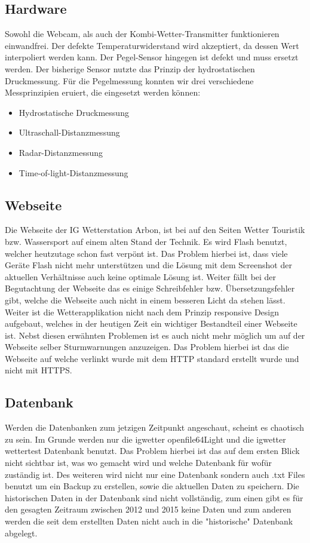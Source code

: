 \documentclass[a4paper,ngerman, 11pt, pagesize]{report}
\begin{document}
\subsection{Hardware}
Sowohl die Webcam, als auch der Kombi-Wetter-Transmitter funktionieren einwandfrei. Der defekte Temperaturwiderstand wird akzeptiert, da dessen Wert interpoliert werden kann. Der Pegel-Sensor hingegen ist defekt und muss ersetzt werden. Der bisherige Sensor nutzte das Prinzip der hydrostatischen Druckmessung. Für die Pegelmessung konnten wir drei verschiedene Messprinzipien eruiert, die eingesetzt werden können:

\begin{itemize}  
\item Hydrostatische Druckmessung
\item Ultraschall-Distanzmessung
\item Radar-Distanzmessung
\item Time-of-light-Distanzmessung
\end{itemize}



\subsection{Webseite}
Die Webseite der IG Wetterstation Arbon, ist bei auf den Seiten Wetter Touristik bzw. Wassersport auf einem alten Stand der Technik. Es wird Flash benutzt, welcher heutzutage schon fast verpönt ist. Das Problem hierbei ist, dass viele Geräte Flash nicht mehr unterstützen und die Lösung mit dem Screenshot der aktuellen Verhältnisse auch keine optimale Lösung ist. Weiter fällt bei der Begutachtung der Webseite das es einige Schreibfehler bzw. Übersetzungsfehler gibt, welche die Webseite auch nicht in einem besseren Licht da stehen lässt. Weiter ist die Wetterapplikation nicht nach dem Prinzip responsive Design aufgebaut, welches in der heutigen Zeit ein wichtiger Bestandteil einer Webseite ist. Nebst diesen erwähnten Problemen ist es auch nicht mehr möglich um auf der Webseite selber Sturmwarnungen anzuzeigen. Das Problem hierbei ist das die Webseite auf welche verlinkt wurde mit dem HTTP standard erstellt wurde und nicht mit HTTPS.
\subsection{Datenbank}
Werden die Datenbanken zum jetzigen Zeitpunkt angeschaut, scheint es chaotisch zu sein. Im Grunde werden nur die igwetter openfile64Light und die igwetter wettertest Datenbank benutzt. Das Problem hierbei ist das auf dem ersten Blick nicht sichtbar ist, was wo gemacht wird und welche Datenbank für wofür zuständig ist. Des weiteren wird nicht nur eine Datenbank sondern auch .txt Files benutzt um ein Backup zu erstellen, sowie die aktuellen Daten zu speichern. Die historischen Daten in der Datenbank sind nicht vollständig, zum einen gibt es für den gesagten Zeitraum zwischen 2012 und 2015 keine Daten und zum anderen werden die seit dem erstellten Daten nicht auch in die "historische" Datenbank abgelegt. 
\end{document}
